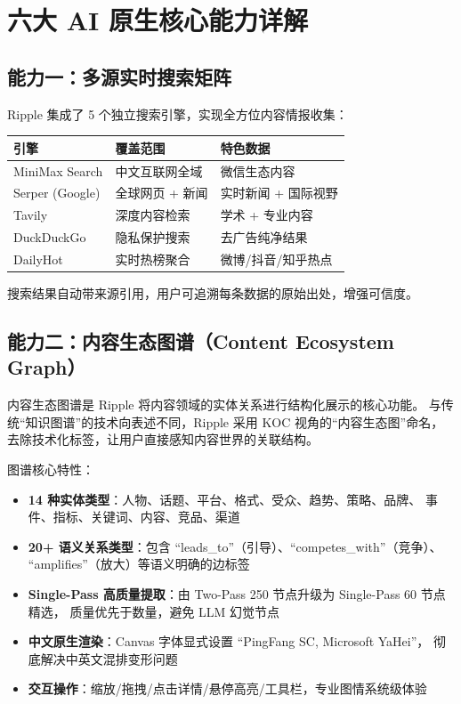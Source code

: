 \documentclass[12pt,a4paper]{ctexart}
\newenvironment{innobox}[1]{%
  \begin{tcolorbox}[colback=secondary!8,colframe=secondary,
    title={\textbf{[创新] #1}},fonttitle=\color{white}\bfseries,
    coltitle=white,left=6pt,right=6pt,top=4pt,bottom=4pt,arc=4pt]
}{%
  \end{tcolorbox}
  \vspace{0.3cm}
}
\begin{document}
\section{六大 AI 原生核心能力详解}

\subsection{能力一：多源实时搜索矩阵}

Ripple 集成了 5 个独立搜索引擎，实现全方位内容情报收集：

\begin{center}
\begin{tabular}{p{3cm} p{5cm} p{5.5cm}}
\toprule
\textbf{引擎} & \textbf{覆盖范围} & \textbf{特色数据} \\
\midrule
MiniMax Search & 中文互联网全域 & 微信生态内容 \\[2pt]
Serper (Google) & 全球网页 + 新闻 & 实时新闻 + 国际视野 \\[2pt]
Tavily & 深度内容检索 & 学术 + 专业内容 \\[2pt]
DuckDuckGo & 隐私保护搜索 & 去广告纯净结果 \\[2pt]
DailyHot & 实时热榜聚合 & 微博/抖音/知乎热点 \\
\bottomrule
\end{tabular}
\end{center}

搜索结果自动带来源引用，用户可追溯每条数据的原始出处，增强可信度。

\subsection{能力二：内容生态图谱（Content Ecosystem Graph）}

\begin{innobox}{创新点：AI 驱动的 KOC 视角内容关系可视化}
内容生态图谱是 Ripple 将内容领域的实体关系进行结构化展示的核心功能。
与传统``知识图谱''的技术向表述不同，Ripple 采用 KOC 视角的``内容生态图''命名，
去除技术化标签，让用户直接感知内容世界的关联结构。
\end{innobox}

图谱核心特性：
\begin{itemize}
  \item \textbf{14 种实体类型}：人物、话题、平台、格式、受众、趋势、策略、品牌、
        事件、指标、关键词、内容、竞品、渠道
  \item \textbf{20+ 语义关系类型}：包含 ``leads\_to''（引导）、``competes\_with''（竞争）、
        ``amplifies''（放大）等语义明确的边标签
  \item \textbf{Single-Pass 高质量提取}：由 Two-Pass 250 节点升级为 Single-Pass 60 节点精选，
        质量优先于数量，避免 LLM 幻觉节点
  \item \textbf{中文原生渲染}：Canvas 字体显式设置 ``PingFang SC, Microsoft YaHei''，
        彻底解决中英文混排变形问题
  \item \textbf{交互操作}：缩放/拖拽/点击详情/悬停高亮/工具栏，专业图情系统级体验
\end{itemize}
\end{document}
